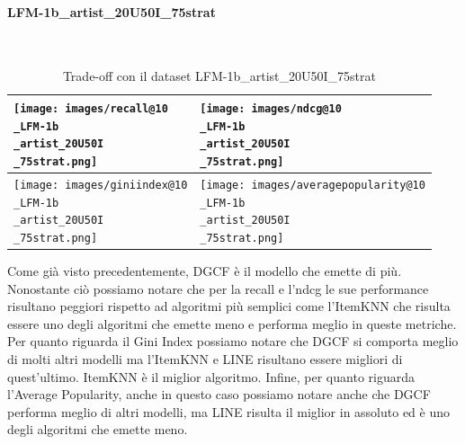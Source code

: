 \paragraph{LFM-1b\_artist\_20U50I\_75strat} \textcolor{white}{.} \\
\begin{table}[H]
    \centering
    \footnotesize
    \setlength\tabcolsep{0pt}
    \begin{tabularx}{\textwidth}{|X|X|}
        \hline
        \texttt{[image: images/recall@10\\\_LFM-1b\\\_artist\_20U50I\\\_75strat.png]} &
        \texttt{[image: images/ndcg@10\\\_LFM-1b\\\_artist\_20U50I\\\_75strat.png]} \\
        \hline
        \texttt{[image: images/giniindex@10\\\_LFM-1b\\\_artist\_20U50I\\\_75strat.png]} &
        \texttt{[image: images/averagepopularity@10\\\_LFM-1b\\\_artist\_20U50I\\\_75strat.png]} \\
        \hline
    \end{tabularx}
    \caption{Trade-off con il dataset LFM-1b\_artist\_20U50I\_75strat}
    \label{tab:emissions_info}
\end{table}

\noindent Come già visto precedentemente, DGCF è il modello che emette di più. Nonostante ciò possiamo notare che per la recall e l'ndcg le sue performance risultano peggiori rispetto ad algoritmi più semplici come l'ItemKNN che risulta essere uno degli algoritmi che emette meno e performa meglio in queste metriche.
Per quanto riguarda il Gini Index possiamo notare che DGCF si comporta meglio di molti altri modelli ma l'ItemKNN e LINE risultano essere migliori di quest'ultimo. ItemKNN è il miglior algoritmo.
Infine, per quanto riguarda l'Average Popularity, anche in questo caso possiamo notare anche che DGCF performa meglio di altri modelli, ma LINE risulta il miglior in assoluto ed è uno degli algoritmi che emette meno.

